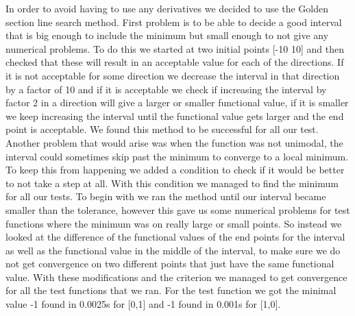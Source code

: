 In order to avoid having to use any derivatives we decided to use the Golden section line search method. First problem is to be able to decide a good interval that is big enough to include the minimum but small enough to not give any numerical problems. To do this we started at two initial points [-10 10] and then checked that these will result in an acceptable value for each of the directions. If it is not acceptable for some direction we decrease the interval in that direction by a factor of 10 and if it is acceptable we check if increasing the interval by factor 2 in a direction will give a larger or smaller functional value, if  it is smaller we keep increasing the interval until the functional value gets larger and the end point is acceptable. We found this method to be successful for all our test. Another problem that would arise was when the function was not unimodal, the interval could sometimes skip past the minimum to converge to a local minimum. To keep this from happening we added a condition to check if it would be better to not take a step at all. With this condition we managed to find the minimum for all our tests. To begin with we ran the method until our interval became smaller than the tolerance, however this gave us some numerical problems for test functions where the minimum was on really large or small points. So instead we looked at the difference of the functional values of the end points for the interval as well as the functional value in the middle of the interval, to make sure we do not get convergence on two different points that just have the same functional value. With these modifications and the criterion we managed to get convergence for all the test functions that we ran. For the test function we got the minimal value -1 found in 0.0025s for [0,1] and -1 found in 0.001s for [1,0]. 
